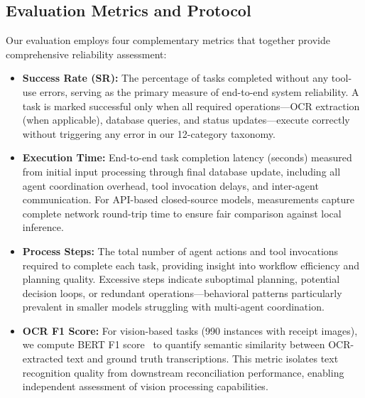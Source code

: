 \documentclass[conference]{IEEEtran}
\begin{document}

\subsection{Evaluation Metrics and Protocol}

Our evaluation employs four complementary metrics that together provide comprehensive reliability assessment:

\begin{itemize}
\item \textbf{Success Rate (SR):} The percentage of tasks completed without any tool-use errors, serving as the primary measure of end-to-end system reliability. A task is marked successful only when all required operations—OCR extraction (when applicable), database queries, and status updates—execute correctly without triggering any error in our 12-category taxonomy.

\item \textbf{Execution Time:} End-to-end task completion latency (seconds) measured from initial input processing through final database update, including all agent coordination overhead, tool invocation delays, and inter-agent communication. For API-based closed-source models, measurements capture complete network round-trip time to ensure fair comparison against local inference.

\item \textbf{Process Steps:} The total number of agent actions and tool invocations required to complete each task, providing insight into workflow efficiency and planning quality. Excessive steps indicate suboptimal planning, potential decision loops, or redundant operations—behavioral patterns particularly prevalent in smaller models struggling with multi-agent coordination.

\item \textbf{OCR F1 Score:} For vision-based tasks (990 instances with receipt images), we compute BERT F1 score~\cite{zhang2020bertscore} to quantify semantic similarity between OCR-extracted text and ground truth transcriptions. This metric isolates text recognition quality from downstream reconciliation performance, enabling independent assessment of vision processing capabilities.
\end{itemize}
\end{document}
